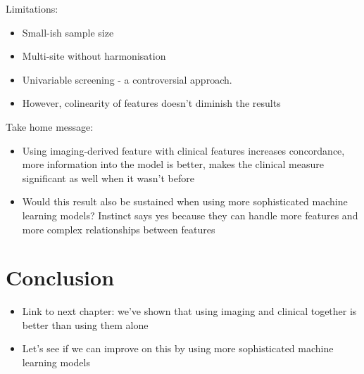 Limitations:
\begin{itemize}
    \item Small-ish sample size
    \item Multi-site without harmonisation
    \item Univariable screening - a controversial approach.
    \item However, colinearity of features doesn't diminish the results
\end{itemize}

Take home message:
\begin{itemize}
    \item Using imaging-derived feature with clinical features increases concordance, more information into the model is better, makes the clinical measure significant as well when it wasn't before
    \item Would this result also be sustained when using more sophisticated machine learning models? Instinct says yes because they can handle more features and more complex relationships between features
\end{itemize}

\section{Conclusion}
\begin{itemize}
    \item Link to next chapter: we've shown that using imaging and clinical together is better than using them alone
    \item Let's see if we can improve on this by using more sophisticated machine learning models
\end{itemize}